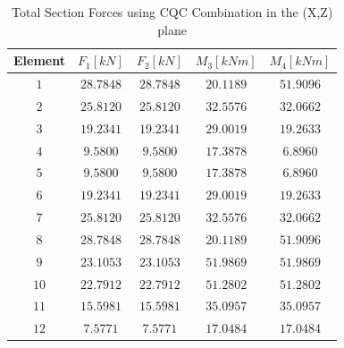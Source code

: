\documentclass[11pt,a4paper,titlepage]{report}
\begin{document}
\begin{table}[h]
    \centering
    \begin{tabular}{c|c|c|c|c}
    Element & $F_1 [kN]$ & $F_2 [kN]$ & $M_3 [kNm]$ & $M_4 [kNm]$ \\
    \hline
       $1$ & $28.7848$ & $28.7848$ & $20.1189$ & $51.9096$ \\
       $2$ & $25.8120$ & $25.8120$ & $32.5576$ & $32.0662$ \\
       $3$ & $19.2341$ & $19.2341$ & $29.0019$ & $19.2633$ \\
       $4$ & $9.5800$ & $9.5800$ & $17.3878$ & $6.8960$ \\
       $5$ & $9.5800$ & $9.5800$ & $17.3878$ & $6.8960$ \\
       $6$ & $19.2341$ & $19.2341$ & $29.0019$ & $19.2633$ \\
       $7$ & $ 25.8120$ & $25.8120$ & $32.5576$ & $32.0662$ \\
       $8$ & $28.7848$ & $28.7848$ & $20.1189$ & $51.9096$ \\
       $9$ & $23.1053$ & $23.1053$ & $51.9869 $ & $51.9869$ \\
       $10$ & $22.7912$ & $22.7912$ & $51.2802$ & $51.2802$ \\
       $11$ & $15.5981$ & $15.5981$ & $35.0957$ & $35.0957$ \\
       $12$ & $7.5771$ & $7.5771 $ & $17.0484$ & $17.0484$ \\
    \end{tabular}
    \caption{Total Section Forces using CQC Combination in the (X,Z) plane}
    \label{tab:totl section forces CQC X}
\end{table}
\end{document}

